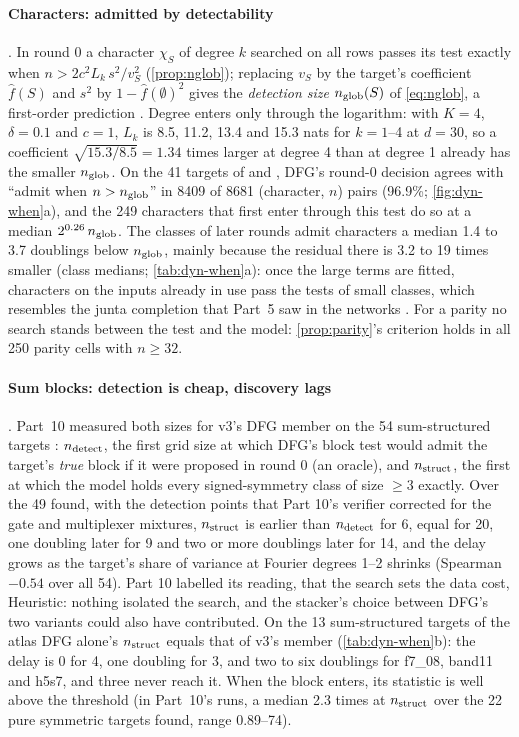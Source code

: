 \paragraph{Characters: admitted by detectability} . In round 0 a character $\chi_S$ of degree $k$ searched on all rows passes its test exactly when $n>2c^2L_k\,s^2/v_S^2$ (\cref{prop:nglob}); replacing $v_S$ by the target's coefficient $\hat f(S)$ and $s^2$ by $1-\hat f(\emptyset)^2$ gives the \emph{detection size} $n_{\rm glob}(S)$ of \cref{eq:nglob}, a first-order prediction . Degree enters only through the logarithm: with $K=4$, $\delta=0.1$ and $c=1$, $L_k$ is 8.5, 11.2, 13.4 and 15.3 nats for $k=1$--4 at $d=30$, so a coefficient $\sqrt{15.3/8.5}=1.34$ times larger at degree 4 than at degree 1 already has the smaller $n_{\rm glob}$. On the 41 targets of  and , DFG's round-0 decision agrees with ``admit when $n>n_{\rm glob}$'' in 8409 of 8681 (character, $n$) pairs (96.9\%; \cref{fig:dyn-when}a), and the 249 characters that first enter through this test do so at a median $2^{0.26}\,n_{\rm glob}$. The classes of later rounds admit characters a median 1.4 to 3.7 doublings below $n_{\rm glob}$, mainly because the residual there is 3.2 to 19 times smaller (class medians; \cref{tab:dyn-when}a): once the large terms are fitted, characters on the inputs already in use pass the tests of small classes, which resembles the junta completion that Part~5 saw in the networks \cite{gdcircuit2026} . For a parity no search stands between the test and the model: \cref{prop:parity}'s criterion holds in all 250 parity cells with $n\ge32$.

\paragraph{Sum blocks: detection is cheap, discovery lags} . Part~10 measured both sizes for v3's DFG member on the 54 sum-structured targets \cite{portfoliolearner2026}: $n_{\rm detect}$, the first grid size at which DFG's block test would admit the target's \emph{true} block if it were proposed in round 0 (an oracle), and $n_{\rm struct}$, the first at which the model holds every signed-symmetry class of size $\ge3$ exactly. Over the 49 found, with the detection points that Part 10's verifier corrected for the gate and multiplexer mixtures, $n_{\rm struct}$ is earlier than $n_{\rm detect}$ for 6, equal for 20, one doubling later for 9 and two or more doublings later for 14, and the delay grows as the target's share of variance at Fourier degrees 1--2 shrinks (Spearman $-0.54$ over all 54). Part 10 labelled its reading, that the search sets the data cost, Heuristic: nothing isolated the search, and the stacker's choice between DFG's two variants could also have contributed. On the 13 sum-structured targets of the atlas DFG alone's $n_{\rm struct}$ equals that of v3's member (\cref{tab:dyn-when}b): the delay is 0 for 4, one doubling for 3, and two to six doublings for f7\_08, band11 and h5s7, and three never reach it. When the block enters, its statistic is well above the threshold (in Part~10's runs, a median 2.3 times at $n_{\rm struct}$ over the 22 pure symmetric targets found, range 0.89--74).

